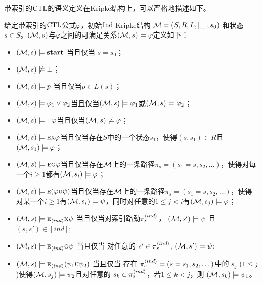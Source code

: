 带索引的$\textrm{CTL}$的语义定义在Kripke结构上，可以严格地描述如下。
\begin{definition}\label{def:ctl:semantic}
	给定带索引的$\textrm{CTL}$公式$\varphi$，初始$\textrm{Ind}$-Kripke结构 ${\cal M}=(S,R,L,[\_],s_0)$ 和状态 $s\in S$。$({\cal M},s)$与$\varphi$之间的可满足关系$({\cal M},s)\models \varphi$定义如下：
	\begin{itemize}
		\item $({\cal M},s) \models \textbf{start}$ 当且仅当 $s=s_0$；
		\item $({\cal M},s) \not \models \bot$；%
		\item $({\cal M},s)\models p$ 当且仅当$p\in L(s)$；
		\item $({\cal M},s) \models \varphi_1 \vee \varphi_2$当且仅当$({\cal M},s)\models \varphi_1$或$({\cal M},s)\models \varphi_2$；
		\item $({\cal M},s)\models \neg \varphi$当且仅当$({\cal M},s)\not \models \varphi$；
		\item $({\cal M},s)\models \textsc{e}\textsc{x} \varphi$当且仅当存在$S$中的一个状态$s_1$，使得$(s,s_1)\in R$且$({\cal M},s_1)\models \varphi$；
		\item $({\cal M},s)\models \textsc{e}\textsc{g}\varphi$当且仅当存在${\cal M}$上的一条路径$\pi_s=(s_1=s, s_2,\dots)$，使得对每一个$i\ge 1$都有$({\cal M},s_i)\models \varphi$；
		\item $({\cal M},s)\models \textsc{e}(\varphi \textsc{u} \psi)$当且仅当存在${\cal M}$上的一条路径$\pi_s=(s_1=s, s_2,\dots)$，使得对某一个$i\ge 1$有$({\cal M},s_i)\models \psi$，同时对任意的$1\leq j < i$有$({\cal M},s_j)\models \varphi$；
		\item $({\cal M},s)\models \textsc{e}_{{\langle{ind}\rangle}} \textsc{x} \psi$ 当且仅当对索引路劲$\pi_{s}^{{\langle{ind}\rangle}}$， $({\cal M}, s')\models \psi$ 且 $(s, s') \in [ind]$;
		\item $({\cal M},s)\models \textsc{e}_{{\langle{ind}\rangle}}\textsc{g}\psi$ 当且仅当
		对任意的 $s' \in  \pi_{s}^{{\langle{ind}\rangle}}$, %
		$({\cal M},s') \models \psi$;
		\item $({\cal M},s)\models \textsc{e}_{{\langle{ind}\rangle}}(\psi_1\textsc{u}\psi_2)$ 当且仅当
		存在 $ \pi_{s}^{{\langle{ind}\rangle}} = (s=s_1, s_2, \dots)$中的 $s_j$ ($1\leq j$)使得$({\cal M},s_j) \models \psi_2$且对任意的 $s_k \in \pi_{s}^{{\langle{ind}\rangle}}$，若$1\leq k < j$，则 $({\cal M},s_k) \models \psi_1$。
	\end{itemize}
\end{definition}


